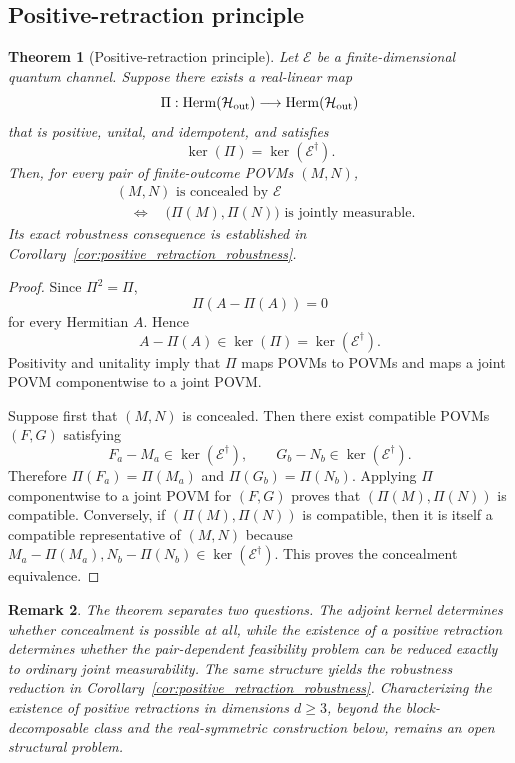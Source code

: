 \documentclass[
aps,pra,twocolumn,10pt,
superscriptaddress,longbibliography,floatfix
]{revtex4-2}
\DeclareMathOperator{\Herm}{Herm}
\newtheorem{theorem}{Theorem}[section]
\newtheorem{remark}[theorem]{Remark}
\begin{document}
\subsection{Positive-retraction principle}

\begin{theorem}[Positive-retraction principle]
\label{thm:positive_retraction}
Let $\mathcal E$ be a finite-dimensional quantum channel. Suppose there exists a real-linear map
\[
\Pi:\Herm(\mathcal H_{\rm out})
\longrightarrow
\Herm(\mathcal H_{\rm out})
\]
that is positive, unital, and idempotent, and satisfies
\[
\ker(\Pi)=\ker(\mathcal E^\dagger).
\]
Then, for every pair of finite-outcome POVMs $(M,N)$,
\begin{equation}
\begin{aligned}
&(M,N)\text{ is concealed by }\mathcal E\\
&\quad\Longleftrightarrow\quad
\bigl(\Pi(M),\Pi(N)\bigr)
\text{ is jointly measurable}.
\end{aligned}
\label{eq:positive_retraction_concealment}
\end{equation}
Its exact robustness consequence is established in Corollary~\ref{cor:positive_retraction_robustness}.
\end{theorem}

\begin{proof}
Since $\Pi^2=\Pi$,
\[
\Pi\!\left(A-\Pi(A)\right)=0
\]
for every Hermitian $A$. Hence
\[
A-\Pi(A)\in\ker(\Pi)=\ker(\mathcal E^\dagger).
\]
Positivity and unitality imply that $\Pi$ maps POVMs to POVMs and maps a joint POVM componentwise to a joint POVM.

Suppose first that $(M,N)$ is concealed. Then there exist compatible POVMs $(F,G)$ satisfying
\[
F_a-M_a\in\ker(\mathcal E^\dagger),
\qquad
G_b-N_b\in\ker(\mathcal E^\dagger).
\]
Therefore $\Pi(F_a)=\Pi(M_a)$ and $\Pi(G_b)=\Pi(N_b)$. Applying $\Pi$ componentwise to a joint POVM for $(F,G)$ proves that $(\Pi(M),\Pi(N))$ is compatible. Conversely, if $(\Pi(M),\Pi(N))$ is compatible, then it is itself a compatible representative of $(M,N)$ because $M_a-\Pi(M_a),N_b-\Pi(N_b)\in\ker(\mathcal E^\dagger)$. This proves the concealment equivalence.
\end{proof}

\begin{remark}
The theorem separates two questions. The adjoint kernel determines whether concealment is possible at all, while the existence of a positive retraction determines whether the pair-dependent feasibility problem can be reduced exactly to ordinary joint measurability. The same structure yields the robustness reduction in Corollary~\ref{cor:positive_retraction_robustness}. Characterizing the existence of positive retractions in dimensions $d\ge3$, beyond the block-decomposable class and the real-symmetric construction below, remains an open structural problem.
\end{remark}
\end{document}
